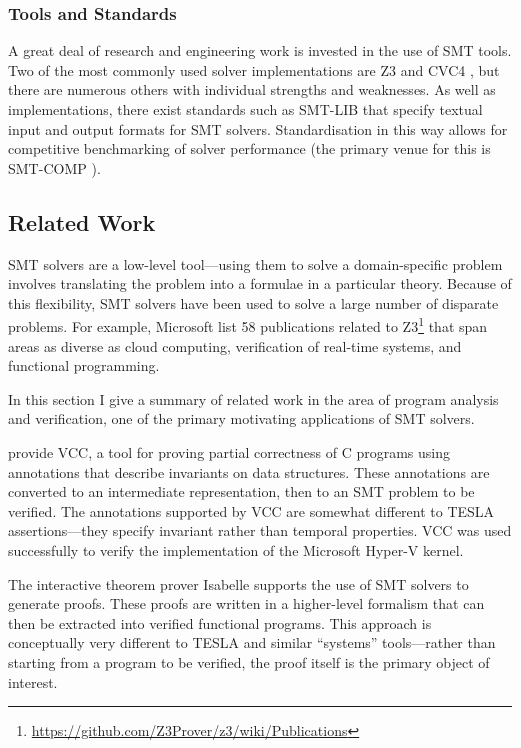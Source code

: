 \subsubsection{Tools and Standards}

A great deal of research and engineering work is invested in the use of SMT
tools. Two of the most commonly used solver implementations are Z3
\cite{de_moura_z3:_2008} and CVC4 \cite{barrett_cvc4_2011}, but there are
numerous others with individual strengths and weaknesses. As well as
implementations, there exist standards such as SMT-LIB \cite{BarFT-SMTLIB} that
specify textual input and output formats for SMT solvers. Standardisation in
this way allows for competitive benchmarking of solver performance (the primary
venue for this is SMT-COMP \cite{CDW14}).

\subsection{Related Work}

SMT solvers are a low-level tool---using them to solve a domain-specific problem
involves translating the problem into a formulae in a particular theory. Because
of this flexibility, SMT solvers have been used to solve a large number of
disparate problems. For example, Microsoft list 58 publications related to
Z3\footnote{\url{https://github.com/Z3Prover/z3/wiki/Publications}} that span
areas as diverse as cloud computing, verification of real-time systems, and
functional programming.

In this section I give a summary of related work in the area of program analysis
and verification, one of the primary motivating applications of SMT solvers.

\textcite{dahlweid_vcc:_2009} provide VCC, a tool for proving partial
correctness of C programs using annotations that describe invariants on data
structures. These annotations are converted to an intermediate representation,
then to an SMT problem to be verified. The annotations supported by VCC are
somewhat different to TESLA assertions---they specify invariant rather than
temporal properties. VCC was used successfully to verify the implementation of
the Microsoft Hyper-V kernel.

The interactive theorem prover Isabelle \cite{paulson_isabelle:_2000} supports
the use of SMT solvers to generate proofs. These proofs are written in a
higher-level formalism that can then be extracted into verified functional
programs. This approach is conceptually very different to TESLA and similar
``systems'' tools---rather than starting from a program to be verified, the
proof itself is the primary object of interest.

